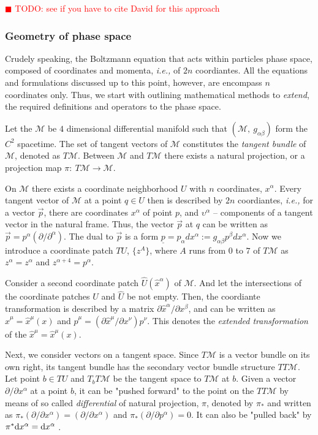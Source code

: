 \documentclass[11pt,a4paper,headinclude=true,DIV=14,BCOR=8mm,chapterprefix,listof=totoc,twoside,openright,abstracton]{scrbook}
\newcommand{\todo}[1]{\textcolor{red}{$\blacksquare$ TODO: #1}}
\begin{document}
\todo{see if you have to cite David for this approach}


\subsubsection{Geometry of phase space}

Crudely speaking, the Boltzmann equation that acts within particles phase space, composed of coordinates and momenta, \textit{i.e.,} of $2n$ coordiantes. All the equations and formulations discussed up to this point, however, are encompass $n$ coordinates only. Thus, we start with outlining mathematical methods to \textit{extend}, the required definitions and operators to the phase space.

Let the $\mathcal{M}$ be $4$ dimensional differential manifold such that $(\mathcal{M},\: g_{\alpha\beta})$ form the $C^2$ spacetime. The set of tangent vectors of $\mathcal{M}$ constitutes the \textit{tangent bundle} of $\mathcal{M}$, denoted as $T\mathcal{M}$. Between $\mathcal{M}$ and $T\mathcal{M}$ there exists a natural projection, or a projection map $\pi:\: T\mathcal{M}\rightarrow\mathcal{M}$. 

On $\mathcal{M}$ there exists a coordinate neighborhood $U$ with $n$ coordinates, $x^{\alpha}$. Every tangent vector of $\mathcal{M}$ at a point $q\in U$ then is described by $2n$ coordiantes, \textit{i.e.,} for a vector $\vec{p}$, there are coordinates $x^{\alpha}$ of point $p$, and $\upsilon^{\alpha}$ -- components of a tangent vector in the natural frame. Thus, the vector $\vec{p}$ at $q$ can be written as $ \vec{p} = p^{\alpha}(\partial / \partial^{\alpha} ) $. The dual to $\vec{p}$ is a form  $\underline{p} = p_{\alpha}dx^{\alpha} := g_{\alpha\beta}p^{\beta}dx^{\alpha}$. Now we introduce a coordinate patch $TU$, $\{z^A\}$, where $A$ runs from $0$ to $7$ of $T\mathcal{M}$ as $z^{\alpha} = z^{\alpha}$ and $z^{\alpha+4} = p^{\alpha}$. 

Consider a second coordinate patch $\hat{U}(\hat{x}^{\alpha})$ of $\mathcal{M}$. And let the intersections of the coordinate patches $U$ and $\hat{U}$ be not empty. Then, the coordiante transformation is described by a matrix $\partial \hat{x}^{\alpha} / \partial x^{\beta}$, and can be written as $\hat{x}^{\mu} = \hat{x}^{\mu}(x)$ and $\hat{p}^{\mu} = (\partial\hat{x}^{\mu} / \partial x^{\nu})p^{\nu}$. This denotes the \textit{extended transformation} of the $\hat{x}^{\mu} = \hat{x}^{\mu}(x)$. 

Next, we consider vectors on a tangent space. Since $T\mathcal{M}$ is a vector bundle on its own right, its tangent bundle has the secondary vector bundle structure $TT\mathcal{M}$. Let point $b\in TU$ and $T_b T\mathcal{M}$ be the tangent space to $T\mathcal{M}$ at $b$. Given a vector $\partial / \partial x^{\alpha}$ at a point $b$, it can be "pushed forward" to the point on the $TT\mathcal{M}$ by means of so called \textit{differential} of natural projection, $\pi$, denoted by $\pi_*$ and written as $\pi_* (\partial / \partial x^{\alpha} ) = (\partial / \partial x^{\alpha})$ and $\pi_* (\partial / \partial p^{\alpha}) = 0$. It can also be "pulled back" by $\pi^* {\text d} x^{\alpha} = {\text d} x^{\alpha}$ \cite{Frankel:2002}. 
\end{document}

